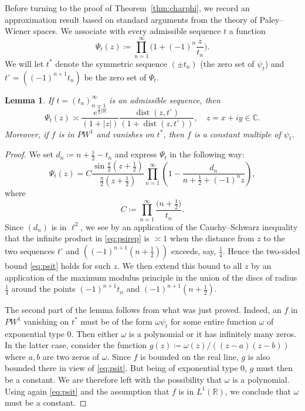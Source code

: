 \documentclass[12pt]{amsart}
\theoremstyle{plain}
\newtheorem{lemma}[theorem]{Lemma}
\numberwithin{equation}{section}
\theoremstyle{definition}
\begin{document}
Before turning to the proof of Theorem~\ref{thm:charphi}, we record an approximation result based on standard arguments from the theory of Paley--Wiener spaces. We associate with every admissible sequence $t$ a function
\[ \Psi_t(z)\coloneqq \prod_{n=1}^\infty \Big(1+(-1)^n \frac{z}{t_n}\Big). \] We will let $ t^\ast$ denote the symmetric sequence $(\pm t_n)$ (the zero set of $\psi_t$) and $t^{\circ}=((-1)^{n+1}t_n)$ be the zero set of $\Psi_t$.

\begin{lemma} \label{lem:adm}
If $t=(t_n)_{n=1}^\infty$ is an admissible sequence, then
\begin{equation} \label{eq:psit} \Psi_t(z) \asymp \frac{e^{\frac{\pi}{2}|y|}}{(1+|z|)} \frac{\operatorname{dist}(z,t^\circ)}{(1+\operatorname{dist}(z,t^\circ))} , \quad z=x+iy\in \mathbb{C} . \end{equation}
Moreover, if $f$ is in $PW^1$ and vanishes on $t^\ast$, then $f$ is a constant multiple of $\psi_t$.
\end{lemma}

\begin{proof}
We set $d_n\coloneqq n+\frac12-t_n$ and express $\Psi_t$ in the following way:
	\begin{equation} \label{eq:psirep}
	\Psi_t(z) = C \frac{\sin \frac{\pi}{2}(z+\frac12)}{\frac{\pi}{2}(z+\frac12)} \prod_{n=1}^\infty \left(1-\frac{d_n}{n+\frac{1}{2}+(-1)^n z} \right),
	\end{equation}
where
\begin{equation} \label{eq:Cdef}  C\coloneqq \prod_{n=1}^\infty  \frac{\big(n+\frac12\big)}{t_n}. \end{equation}
Since $(d_n)$ is in $\ell^2$, we see by an application of the Cauchy--Schwarz inequality that the infinite product in \eqref{eq:psirep} is $\asymp 1$ when the distance from $z$ to the two sequences $t^\circ$ and $((-1)^{n+1}(n+\frac12))$ exceeds, say, $\frac14$. Hence the two-sided bound \eqref{eq:psit} holds for such $z$. We then extend this bound to all $z$ by an application of the maximum modulus principle in the union of the discs of radius $\frac14$ around the points $(-1)^{n+1}t_n$ and $(-1)^{n+1}(n+\frac12)$.

The second part of the lemma follows from what was just proved. Indeed, an $f$
in $PW^1$ vanishing on $t^\ast$ must be of the form $\omega\psi_t$ for some entire function $\omega$ of exponential type
$0$. Then either $\omega$ is
a polynomial or it has infinitely many zeros. In the latter case, consider the
function $g(z) \coloneqq \omega(z)/((z-a)(z-b))$ where $a,b$ are two zeros of $\omega$.
Since $f$ is bounded on the real line,  $g$ is also bounded there in view of \eqref{eq:psit}. But being of exponential type $0$, $g$ must then be a constant.
We are therefore left with the possibility that $\omega$ is a polynomial. Using again \eqref{eq:psit} and the assumption that $f$ is in
$L^1(\mathbb R)$, we conclude that $\omega$ must be a constant.
\end{proof}
\end{document}
